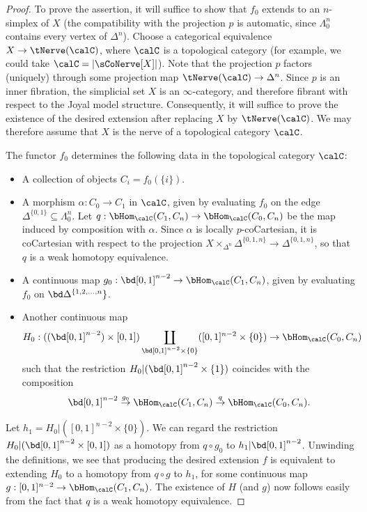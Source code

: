 \begin{proof}
To prove the assertion, it will suffice to show that $f_0$ extends to an $n$-simplex of $X$
(the compatibility with the projection $p$ is automatic, since $\Lambda^{n}_0$ contains every vertex of
$\Delta^n$). Choose a categorical equivalence $X \rightarrow \tNerve(\calC)$, where $\calC$
is a topological category (for example, we could take $\calC = | \sCoNerve[X] |$). Note that
the projection $p$ factors (uniquely) through some projection map $\tNerve(\calC) \rightarrow \Delta^n$.
Since $p$ is an inner fibration, the simplicial set $X$ is an $\infty$-category, and therefore fibrant with respect to the Joyal model structure. Consequently, it will suffice to prove the existence of the desired extension after replacing $X$ by $\tNerve(\calC)$. We may therefore assume that $X$ is the nerve of a topological category $\calC$.

The functor $f_0$ determines the following data in the topological category $\calC$:
\begin{itemize}
\item[$(1)$] A collection of objects $C_{i} = f_0( \{i \})$. 
\item[$(2)$] A morphism $\alpha: C_0 \rightarrow C_1$ in $\calC$, given by evaluating
$f_0$ on the edge $\Delta^{ \{0,1\} } \subseteq \Lambda^{n}_0$.
Let $q: \bHom_{\calC}(C_1, C_n) \rightarrow \bHom_{\calC}(C_0, C_n)$ be the map induced by composition with $\alpha$. Since $\alpha$ is locally $p$-coCartesian, it is coCartesian with
respect to the projection $X \times_{ \Delta^n} \Delta^{ \{0,1, n\}} \rightarrow
\Delta^{ \{0,1,n\} }$, so that $q$ is a weak homotopy equivalence.
\item[$(3)$] A continuous map $g_0: \bd [0,1]^{n-2} \rightarrow \bHom_{\calC}( C_1, C_n)$, given by
evaluating $f_0$ on $\bd \Delta^{ \{1, 2, \ldots, n} \}$. 
\item[$(4)$] Another continuous map 
$$H_0: ((\bd [0,1]^{n-2}) \times [0,1]) \coprod_{ \bd [0,1]^{n-2} \times \{0\} } ([0,1]^{n-2} \times \{0\})
\rightarrow \bHom_{\calC}(C_0, C_n)$$ such that the restriction
$H_0 | ( \bd [0,1]^{n-2} \times \{1\} )$ coincides with the composition
$$ \bd [0,1]^{n-2} \stackrel{g_0}{\rightarrow} \bHom_{\calC}(C_1, C_n)
\stackrel{q}{\rightarrow} \bHom_{\calC}(C_0, C_n).$$
\end{itemize}

Let $h_1 = H_0 | ( [0,1]^{n-2} \times \{0\} )$.
We can regard the restriction $H_0 | ( \bd [0,1]^{n-2} \times [0,1] )$ as a homotopy
from $q \circ g_0$ to $h_1 | \bd [0,1]^{n-2}$. Unwinding the definitions, we see that
producing the desired extension $f$ is equivalent to extending $H_0$ to a homotopy
from $q \circ g$ to $h_1$, for some continuous map $g: [0,1]^{n-2} \rightarrow \bHom_{\calC}(C_1, C_n)$. The existence of $H$ (and $g$) now follows easily from the fact that $q$ is a weak homotopy equivalence.
\end{proof}


